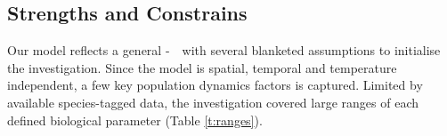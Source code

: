 \documentclass[../thesis.tex]{subfiles} %
\begin{document}
\subsection{Strengths and Constrains}
Our model reflects a general \phy-\bac\ \pbs\ with several blanketed assumptions to initialise the investigation.  Since the model is spatial, temporal and temperature independent, a few key population dynamics factors is captured.  Limited by available species-tagged data, the investigation covered large ranges of each defined biological parameter (Table \ref{t:ranges}).


\end{document}
